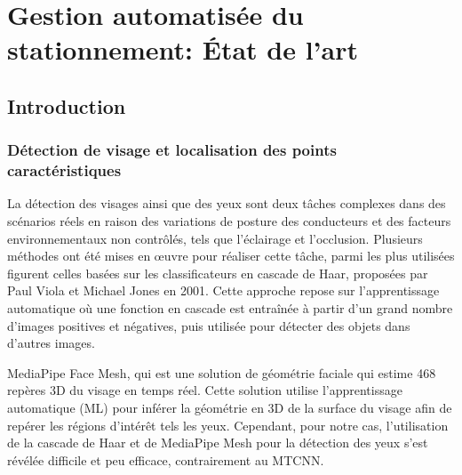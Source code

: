 \chapter{Gestion automatisée du stationnement: État de l'art}

\section{Introduction}
\subsection{ Détection de visage et  localisation des points caractéristiques}
La détection des visages ainsi que des yeux sont deux tâches complexes dans des scénarios réels en raison des variations de posture des conducteurs et des facteurs environnementaux non contrôlés, tels que l’éclairage et l’occlusion. Plusieurs méthodes ont été mises en œuvre pour réaliser cette tâche, parmi les plus utilisées figurent celles basées sur les classificateurs en cascade de Haar, proposées par Paul Viola et Michael Jones en 2001\cite{HaarCascades}. Cette approche repose sur l'apprentissage automatique où une fonction en cascade est entraînée à partir d'un grand nombre d'images positives et négatives, puis utilisée pour détecter des objets dans d'autres images.

MediaPipe Face Mesh, qui est une solution de géométrie faciale qui estime 468 repères 3D du visage en temps réel. Cette solution utilise l’apprentissage automatique (ML) pour inférer la géométrie en 3D de la surface du visage \cite{MediaPipe} afin de repérer les régions d'intérêt tels les yeux.
Cependant, pour notre cas, l'utilisation de la cascade de Haar et de MediaPipe Mesh pour la détection des yeux s'est révélée difficile et peu efficace, contrairement au MTCNN.

